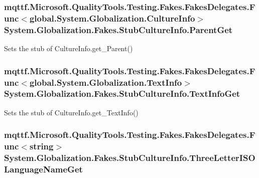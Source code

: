 \hypertarget{class_system_1_1_globalization_1_1_fakes_1_1_stub_culture_info_a3ce91e2a2d535938e672c202e5d4b726}{
\subsubsection[{Parent\-Get}]{\setlength{\rightskip}{0pt plus 5cm}mqttf.\-Microsoft.\-Quality\-Tools.\-Testing.\-Fakes.\-Fakes\-Delegates.\-Func$<$global.\-System.\-Globalization.\-Culture\-Info$>$ System.\-Globalization.\-Fakes.\-Stub\-Culture\-Info.\-Parent\-Get}}\label{class_system_1_1_globalization_1_1_fakes_1_1_stub_culture_info_a3ce91e2a2d535938e672c202e5d4b726}


Sets the stub of Culture\-Info.\-get\-\_\-\-Parent()

\hypertarget{class_system_1_1_globalization_1_1_fakes_1_1_stub_culture_info_a1c78d61337ad755e7269a89001065bbd}{
\subsubsection[{Text\-Info\-Get}]{\setlength{\rightskip}{0pt plus 5cm}mqttf.\-Microsoft.\-Quality\-Tools.\-Testing.\-Fakes.\-Fakes\-Delegates.\-Func$<$global.\-System.\-Globalization.\-Text\-Info$>$ System.\-Globalization.\-Fakes.\-Stub\-Culture\-Info.\-Text\-Info\-Get}}\label{class_system_1_1_globalization_1_1_fakes_1_1_stub_culture_info_a1c78d61337ad755e7269a89001065bbd}


Sets the stub of Culture\-Info.\-get\-\_\-\-Text\-Info()

\hypertarget{class_system_1_1_globalization_1_1_fakes_1_1_stub_culture_info_afa1187538e50496d591fccb15e34e6b6}{
\subsubsection[{Three\-Letter\-I\-S\-O\-Language\-Name\-Get}]{\setlength{\rightskip}{0pt plus 5cm}mqttf.\-Microsoft.\-Quality\-Tools.\-Testing.\-Fakes.\-Fakes\-Delegates.\-Func$<$string$>$ System.\-Globalization.\-Fakes.\-Stub\-Culture\-Info.\-Three\-Letter\-I\-S\-O\-Language\-Name\-Get}}\label{class_system_1_1_globalization_1_1_fakes_1_1_stub_culture_info_afa1187538e50496d591fccb15e34e6b6}


